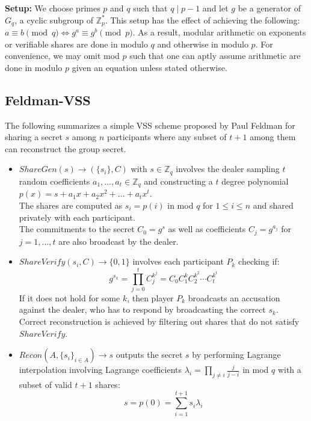 \documentclass[letterpaper,twocolumn,10pt]{article}
\theoremstyle{definition}
\theoremstyle{remark}
\begin{document}
\textbf{Setup:} We choose primes $p$ and $q$ such that $q \mid p - 1$ and let $g$ be a generator of $G_q$, a cyclic subgroup of $\mathbb{Z}^*_p$. This setup has the effect of achieving the following: $a \equiv b \pmod q \iff g^a \equiv g^b \pmod p$. As a result, modular arithmetic on exponents or verifiable shares are done in modulo $q$ and otherwise in modulo $p$. For convenience, we may omit mod $p$ such that one can aptly assume arithmetic are done in modulo $p$ given an equation unless stated otherwise.
\subsection{Feldman-VSS}
\label{appendix:feldmanVSS}
The following summarizes a simple VSS scheme proposed by Paul Feldman for sharing a secret $s$ among $n$ participants where any subset of $t+1$ among them can reconstruct the group secret.
\begin{itemize}
    \item $ShareGen(s) \rightarrow (\{s_i\}, C)$ with $s \in \mathbb{Z}_q$ involves the dealer sampling $t$ random coefficients $a_1, \ldots, a_t \in \mathbb{Z}_q$ and constructing a $t$ degree polynomial $p(x) = s + a_1x+ a_2x^2 +\ldots+a_tx^t$.\\
    The shares are computed as $s_i = p(i)$ in mod $q$ for $1\le i \le n$ and shared privately with each participant.\\
    The commitments to the secret $C_0 = g^s$ as well as coefficients $C_j = g^{a_j}$ for $j = 1,\ldots,t$ are also broadcast by the dealer.
    
    \item $ShareVerify(s_i, C) \rightarrow \{0, 1\}$ involves each participant $P_k$  checking if:
    $$g^{s_k} = \prod_{j = 0}^{t } C_j^{k^j} = C_0 C_1^k C_2^{k^2} \cdots C_{t }^{k^{t }}$$
     If it does not hold for some $k$, then player $P_k$ broadcasts an accusation against the dealer, who has to respond by broadcasting the correct $s_k$. \\
     Correct reconstruction is achieved by filtering out shares that do not satisfy $ShareVerify$.
    \item $Recon(A, \{s_i\}_{i \in A}) \rightarrow s$ outputs the secret $s$ by performing  Lagrange interpolation involving Lagrange coefficients $\lambda_i = \prod_{j \neq i} \frac{j}{j - i}$ in mod $q$ with a subset of valid $t+1$ shares:
    $$s = p(0) = \sum_{i = 1}^{t+1} s_i \lambda_i$$
\end{itemize}
\end{document}
